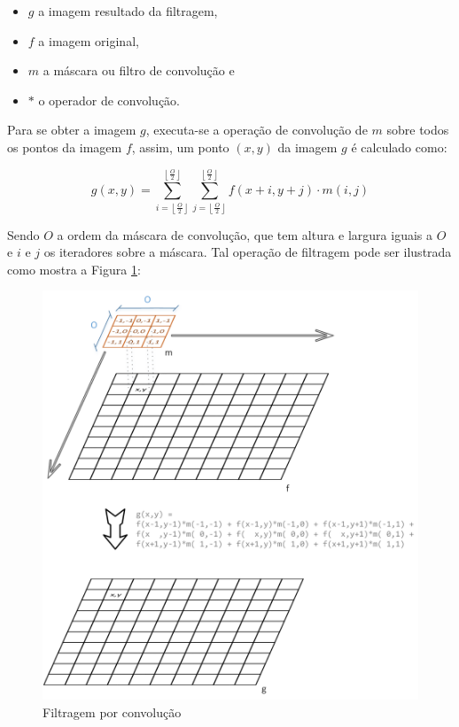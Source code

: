 \begin{itemize}
\item \(g\) a imagem resultado da filtragem, 
\item \(f\) a imagem original, 
\item \(m\) a máscara ou filtro de convolução e 
\item \(*\) o operador de convolução.
\end{itemize}

Para se obter a imagem \(g\), executa-se a operação de convolução de \(m\) sobre todos os pontos da imagem \(f\), assim, um ponto \((x,y)\) da imagem \(g\) é calculado como:
	
\[
g(x,y) = 
\sum_{i=\left\lfloor\frac{O}{2}\right\rfloor}^{\left\lfloor\frac{O}{2}\right\rfloor}
\sum_{j=\left\lfloor\frac{O}{2}\right\rfloor}^{\left\lfloor\frac{O}{2}\right\rfloor}  f(x+i, y+j) \cdot m(i,j)
\]

Sendo \(O\) a ordem da máscara de convolução, que tem altura e largura iguais a \(O\) e \(i\) e \(j\) os iteradores sobre a máscara. Tal operação de filtragem pode ser ilustrada como mostra a Figura \ref{fig:Convolution}:

\begin{figure}[h]
	\centering	
	\includegraphics[scale=0.55]{Figuras/Convolutio.png}
	\caption{Filtragem por convolução}
	\label{fig:Convolution}
\end{figure}

